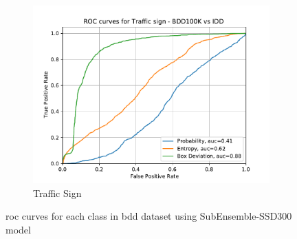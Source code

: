 \begin{figure}[H]
    	\begin{center}
    	\begin{subfigure}[t]{0.495\textwidth}
    		\centering
    		\includegraphics[width=\textwidth]{images/ROC/traffic sign_ROC_bdd_vs_idd_Score_using_subens.pdf}
    		\caption{Traffic Sign}
    	\end{subfigure}
    	\end{center}
        \vspace*{-3mm}
        \caption[Class-wise ROC curves for \acrshort{ood} sample classification using uncertainty quantification metrics with Sub-Ensemble models]{\acrlong{roc} curves for each class in \acrshort{bdd} dataset using SubEnsemble-SSD300 model}
        \label{fig:roc_subens}
    \end{figure}
    
    
    
    
